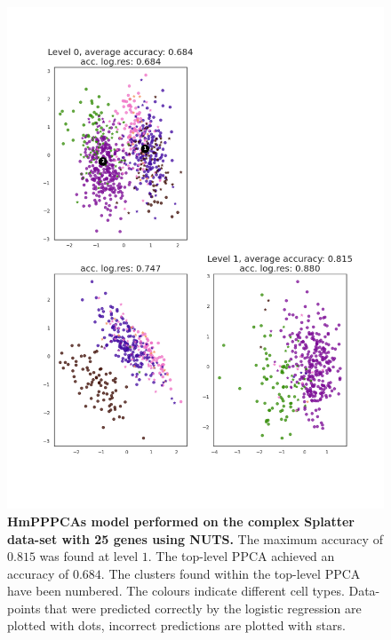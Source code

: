 \begin{figure}
    \centering
    \includegraphics[width=\linewidth]{figs/complex_25_nuts.png}
    \caption[HmPPPCAs model performed on the complex Splatter data-set with 25 genes using NUTS]{\small \textbf{HmPPPCAs model performed on the complex Splatter data-set with 25 genes using NUTS.} \small The maximum accuracy of $0.815$ was found at level $1$. The top-level PPCA achieved an accuracy of $0.684$. The clusters found within the top-level PPCA have been numbered. The colours indicate different cell types. Data-points that were predicted correctly by the logistic regression are plotted with dots, incorrect predictions are plotted with stars.}
    \label{fig:complex_25_nuts}
\end{figure}

